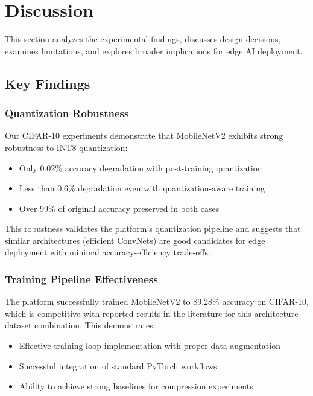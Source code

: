 \section{Discussion}

This section analyzes the experimental findings, discusses design decisions, examines limitations, and explores broader implications for edge AI deployment.

\subsection{Key Findings}

\subsubsection{Quantization Robustness}
Our CIFAR-10 experiments demonstrate that MobileNetV2 exhibits strong robustness to INT8 quantization:
\begin{itemize}
\item Only 0.02\% accuracy degradation with post-training quantization
\item Less than 0.6\% degradation even with quantization-aware training
\item Over 99\% of original accuracy preserved in both cases
\end{itemize}

This robustness validates the platform's quantization pipeline and suggests that similar architectures (efficient ConvNets) are good candidates for edge deployment with minimal accuracy-efficiency trade-offs.

\subsubsection{Training Pipeline Effectiveness}
The platform successfully trained MobileNetV2 to 89.28\% accuracy on CIFAR-10, which is competitive with reported results in the literature for this architecture-dataset combination. This demonstrates:
\begin{itemize}
\item Effective training loop implementation with proper data augmentation
\item Successful integration of standard PyTorch workflows
\item Ability to achieve strong baselines for compression experiments
\end{itemize}

